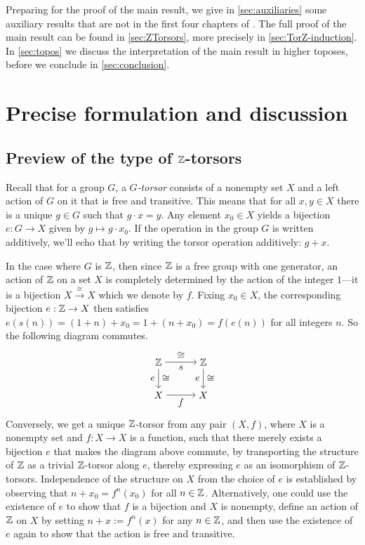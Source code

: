 \documentclass[a4paper,12pt]{amsart}
\begin{document}
Preparing for the proof of the main result,
we give in \cref{sec:auxiliaries} some auxiliary results
that are not in the first four chapters of \cite{hottbook}.
The full proof of the main result can be found in \cref{sec:ZTorsors},
more precisely in \cref{sec:TorZ-induction}.
In \cref{sec:topos} we discuss the interpretation of the main result
in higher toposes, before we conclude in \cref{sec:conclusion}.


\section{Precise formulation and discussion}
\label{sec:statement}

\subsection{Preview of the type of \texorpdfstring{$\mathbb{Z}$}{Z}-torsors}
\label{sec:preview-Z-tors}

Recall that for a group $G$, a \emph{$G$-torsor} consists of a nonempty set $X$ and
a left action of $G$ on it that is free and transitive.
This means that for all $x,y \in X$ there is a unique $g \in G$ such
that $g \cdot x = y$.
Any element $x_0 \in X$ yields a bijection $e: G \to X$ given by $g \mapsto g \cdot x_0$.
If the operation in the group $G$ is written additively, we'll echo that by writing the torsor operation additively: $g + x$.

In the case where $G$ is $\mathbb{Z}$, then since $\mathbb{Z}$ is a free group with one generator, an action of $\mathbb{Z}$ on a set $X$ is completely
determined by the action of the integer $1$---it is a bijection $X \xrightarrow{\cong} X$ which we denote by $f$.
Fixing $x_0\in X$, the corresponding bijection $e : \mathbb{Z} \to X$ then satisfies
  $e(s(n)) = (1+n) + x_0 = 1 + (n + x_0) = f(e(n))$ for all
integers $n$.
So the following diagram commutes.
\[
\begin{tikzpicture} %
   \matrix (m)
   [matrix of math nodes, row sep=2em, column sep=3em, ampersand replacement=\&]
    {\zet \& \zet \\ X \& X \\ };
\draw[->] (m-1-1) -- (m-1-2) node[midway,below] {$s$} node[midway,above] {$\cong$};
\draw[->] (m-1-1) -- (m-2-1) node[midway,left] {$e$} node[midway,right] {$\cong$};
\draw[->] (m-1-2) -- (m-2-2) node[midway,left] {$e$} node[midway,right] {$\cong$};
\draw[->] (m-2-1) -- (m-2-2) node[midway,below] {$f$} ;
\end{tikzpicture}
\]
Conversely, we get a unique $\mathbb{Z}$-torsor from any pair $(X,f)$, where $X$ is a nonempty set and $f : X \to X$ is a function, such that there merely
exists a bijection $e$ that makes the diagram above commute, by transporting the structure of $\mathbb{Z}$ as a trivial $\mathbb{Z}$-torsor along $e$, thereby
expressing $e$ as an isomorphism of $\mathbb{Z}$-torsors.  Independence of the structure on $X$ from the choice of $e$ is established by observing that
$n + x_0 = f^n(x_0)$ for all $n \in \mathbb{Z}$.
Alternatively, one could use the existence of $e$ to show that $f$ is a bijection and $X$ is nonempty,
define an action of $\mathbb{Z}$ on $X$ by setting $n + x := f^n(x)$ for any $n \in \mathbb{Z}$, and then use the existence of $e$ again to show that the
action is free and transitive.
\end{document}
